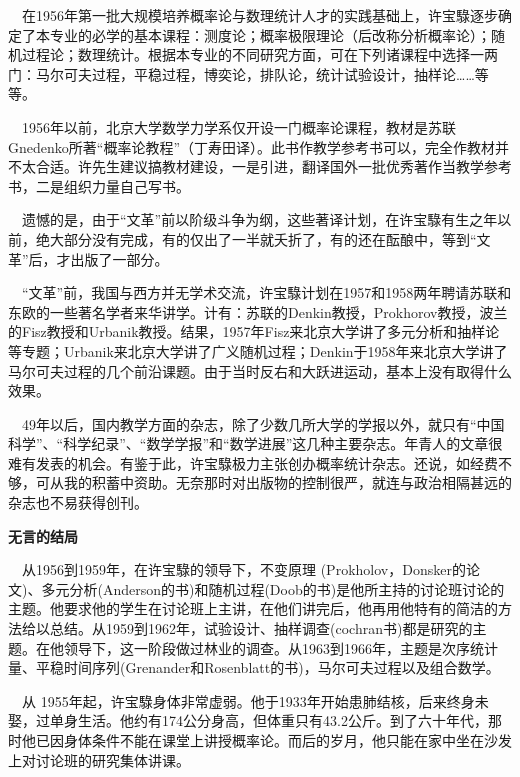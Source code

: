 \begin{frame}
	$\quad$在1956年第一批大规模培养概率论与数理统计人才的实践基础上，许宝騄逐步确定了本专业的必学的基本课程：测度论；概率极限理论（后改称分析概率论）；随机过程论；数理统计。根据本专业的不同研究方面，可在下列诸课程中选择一两门：马尔可夫过程，平稳过程，博奕论，排队论，统计试验设计，抽样论……等等。
	
	$\quad$1956年以前，北京大学数学力学系仅开设一门概率论课程，教材是苏联Gnedenko所著“概率论教程”（丁寿田译）。此书作教学参考书可以，完全作教材并不太合适。许先生建议搞教材建设，一是引进，翻译国外一批优秀著作当教学参考书，二是组织力量自己写书。
	
	$\quad$遗憾的是，由于“文革”前以阶级斗争为纲，这些著译计划，在许宝騄有生之年以前，绝大部分没有完成，有的仅出了一半就夭折了，有的还在酝酿中，等到“文革”后，才出版了一部分。
	
\end{frame}

\begin{frame}
	$\quad$“文革”前，我国与西方并无学术交流，许宝騄计划在1957和1958两年聘请苏联和东欧的一些著名学者来华讲学。计有：苏联的Denkin教授，Prokhorov教授，波兰的Fisz教授和Urbanik教授。结果，1957年Fisz来北京大学讲了多元分析和抽样论等专题；Urbanik来北京大学讲了广义随机过程；Denkin于1958年来北京大学讲了马尔可夫过程的几个前沿课题。由于当时反右和大跃进运动，基本上没有取得什么效果。
		
	$\quad$49年以后，国内教学方面的杂志，除了少数几所大学的学报以外，就只有“中国科学”、“科学纪录”、“数学学报”和“数学进展”这几种主要杂志。年青人的文章很难有发表的机会。有鉴于此，许宝騄极力主张创办概率统计杂志。还说，如经费不够，可从我的积蓄中资助。无奈那时对出版物的控制很严，就连与政治相隔甚远的杂志也不易获得创刊。
\end{frame}

\begin{frame}
	\textbf{无言的结局}
	
	$\quad$从1956到1959年，在许宝騄的领导下，不变原理 (Prokholov，Donsker的论文)、多元分析(Anderson的书)和随机过程(Doob的书)是他所主持的讨论班讨论的主题。他要求他的学生在讨论班上主讲，在他们讲完后，他再用他特有的简洁的方法给以总结。从1959到1962年，试验设计、抽样调查(cochran书)都是研究的主题。在他领导下，这一阶段做过林业的调查。从1963到1966年，主题是次序统计量、平稳时间序列(Grenander和Rosenblatt的书)，马尔可夫过程以及组合数学。
	
	$\quad$从 1955年起，许宝騄身体非常虚弱。他于1933年开始患肺结核，后来终身未娶，过单身生活。他约有174公分身高，但体重只有43.2公斤。到了六十年代，那时他已因身体条件不能在课堂上讲授概率论。而后的岁月，他只能在家中坐在沙发上对讨论班的研究集体讲课。
\end{frame}

